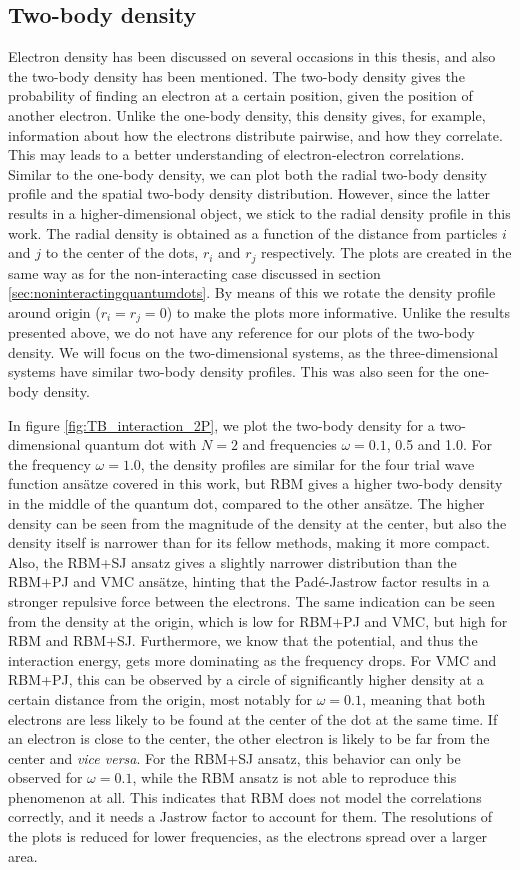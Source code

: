 \subsection{Two-body density}
Electron density has been discussed on several occasions in this thesis, and also the two-body density has been mentioned. The two-body density gives the probability of finding an electron at a certain position, given the position of another electron. Unlike the one-body density, this density gives, for example, information about how the electrons distribute pairwise, and how they correlate. This may leads to a better understanding of electron-electron correlations. Similar to the one-body density, we can plot both the radial two-body density profile and the spatial two-body density distribution. However, since the latter results in a higher-dimensional object, we stick to the radial density profile in this work. The radial density is obtained as a function of the distance from particles $i$ and $j$ to the center of the dots, $r_i$ and $r_j$ respectively. The plots are created in the same way as for the non-interacting case discussed in section \ref{sec:noninteractingquantumdots}. By means of this we rotate the density profile around origin ($r_i=r_j=0$) to make the plots more informative. Unlike the results presented above, we do not have any reference for our plots of the two-body density. We will focus on the two-dimensional systems, as the three-dimensional systems have similar two-body density profiles. This was also seen for the one-body density.

In figure \eqref{fig:TB_interaction_2P}, we plot the two-body density for a two-dimensional quantum dot with $N=2$ and frequencies $\omega=0.1$, 0.5 and 1.0. For the frequency $\omega=1.0$, the density profiles are similar for the four trial wave function ansätze covered in this work, but RBM gives a higher two-body density in the middle of the quantum dot, compared to the other ansätze. The higher density can be seen from the magnitude of the density at the center, but also the density itself is narrower than for its fellow methods, making it more compact. Also, the RBM+SJ ansatz gives a slightly narrower distribution than the RBM+PJ and VMC ansätze, hinting that the Padé-Jastrow factor results in a stronger repulsive force between the electrons. The same indication can be seen from the density at the origin, which is low for RBM+PJ and VMC, but high for RBM and RBM+SJ. Furthermore, we know that the potential, and thus the interaction energy, gets more dominating as the frequency drops. For VMC and RBM+PJ, this can be observed by a circle of significantly higher density at a certain distance from the origin, most notably for $\omega=0.1$, meaning that both electrons are less likely to be found at the center of the dot at the same time. If an electron is close to the center, the other electron is likely to be far from the center and \textit{vice versa}. For the RBM+SJ ansatz, this behavior can only be observed for $\omega=0.1$, while the RBM ansatz is not able to reproduce this phenomenon at all. This indicates that RBM does not model the correlations correctly, and it needs a Jastrow factor to account for them. The resolutions of the plots is reduced for lower frequencies, as the electrons spread over a larger area.

